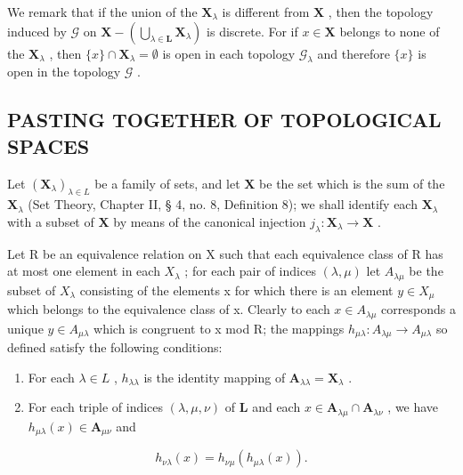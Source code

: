 We remark that if the union of the \(\mathbf{X}_{\lambda}\) is different from \(\mathbf{X}\) , then the topology induced by \(\mathcal{G}\) on \(\mathbf{X} - \left(\bigcup_{\lambda \in \mathbf{L}} \mathbf{X}_{\lambda}\right)\) is discrete. For if \(x \in \mathbf{X}\) belongs to none of the \(\mathbf{X}_{\lambda}\) , then \(\{x\} \cap \mathbf{X}_{\lambda} = \emptyset\) is open in each topology \(\mathcal{G}_{\lambda}\) and therefore \(\{x\}\) is open in the topology \(\mathcal{G}\) .

\subsection{PASTING TOGETHER OF TOPOLOGICAL SPACES}

Let \((\mathbf{X}_{\lambda})_{\lambda \in L}\) be a family of sets, and let \(\mathbf{X}\) be the set which is the sum of the \(\mathbf{X}_{\lambda}\) (Set Theory, Chapter II, § 4, no. 8, Definition 8); we shall identify each \(\mathbf{X}_{\lambda}\) with a subset of \(\mathbf{X}\) by means of the canonical injection \(j_{\lambda}: \mathbf{X}_{\lambda} \to \mathbf{X}\) .

Let R be an equivalence relation on X such that each equivalence class of R has at most one element in each \(X_{\lambda}\) ; for each pair of indices \((\lambda, \mu)\) let \(A_{\lambda\mu}\) be the subset of \(X_{\lambda}\) consisting of the elements x for which there is an element \(y \in X_{\mu}\) which belongs to the equivalence class of x. Clearly to each \(x \in A_{\lambda\mu}\) corresponds a unique \(y \in A_{\mu\lambda}\) which is congruent to x mod R; the mappings \(h_{\mu\lambda}: A_{\lambda\mu} \to A_{\mu\lambda}\) so defined satisfy the following conditions:

\begin{enumerate}
\def\labelenumi{(\roman{enumi})}
\item
  For each \(\lambda \in L\) , \(h_{\lambda \lambda}\) is the identity mapping of \(\mathbf{A}_{\lambda \lambda} = \mathbf{X}_{\lambda}\) .
\item
  For each triple of indices \((\lambda, \mu, \nu)\) of \(\mathbf{L}\) and each \(x \in \mathbf{A}_{\lambda \mu} \cap \mathbf{A}_{\lambda \nu}\) , we have \(h_{\mu \lambda}(x) \in \mathbf{A}_{\mu \nu}\) and
\end{enumerate}

\[
h _ {\nu \lambda} (x) = h _ {\nu \mu} (h _ {\mu \lambda} (x)).\tag{1}
\]

